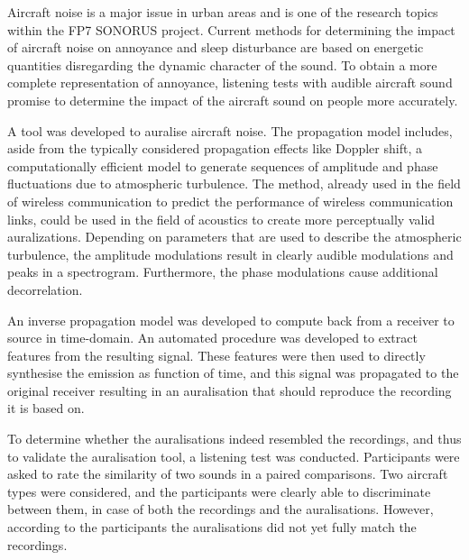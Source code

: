 Aircraft noise is a major issue in urban areas and is one of the research topics
within the FP7 SONORUS project. Current methods for determining the impact of
aircraft noise on annoyance and sleep disturbance are based on energetic
quantities disregarding the dynamic character of the sound. To obtain a more
complete representation of annoyance, listening tests with audible aircraft
sound promise to determine the impact of the aircraft sound on people more accurately.

A tool was developed to auralise aircraft noise. The propagation model includes,
aside from the typically considered propagation effects like Doppler shift, a
computationally efficient model to generate sequences of amplitude and phase
fluctuations due to atmospheric turbulence. The method, already used in the
field of wireless communication to predict the performance of wireless
communication links, could be used in the field of acoustics to create more
perceptually valid auralizations. Depending on parameters that are used to
describe the atmospheric turbulence, the amplitude modulations result in clearly
audible modulations and peaks in a spectrogram. Furthermore, the phase
modulations cause additional decorrelation.

An inverse propagation model was developed to compute back from a receiver to
source in time-domain. An automated procedure was developed to extract features
from the resulting signal. These features were then used to directly synthesise
the emission as function of time, and this signal was propagated to the original
receiver resulting in an auralisation that should reproduce the recording
it is based on.

To determine whether the auralisations indeed resembled the recordings, and thus
to validate the auralisation tool, a listening test was conducted. Participants
were asked to rate the similarity of two sounds in a paired comparisons. Two
aircraft types were considered, and the participants were clearly able to
discriminate between them, in case of both the recordings and the auralisations.
However, according to the participants the auralisations did not yet fully match
the recordings.





